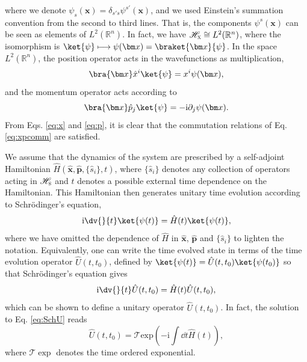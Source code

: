 \documentclass[letterpaper,12pt,titlepage,oneside,final]{book}
\newcommand{\ii}{\mathrm{i}}
\begin{document}
where we denote $\psi_s(\bm x)=\delta_{s's}\psi^{s'}(\bm x)$, and we used Einstein's summation convention from the second to third lines. That is, the components $\psi^s(\bm x)$ can be seen as elements of $L^2(\mathbb{R}^n)$. In fact, we have $\mathscr{H}_\textsc{x}\cong L^2(\mathbb{R}^n)$, where the isomorphism is $\ket{\psi}\longmapsto \psi(\bm x) = \braket{\bm x}{\psi}$. In the space $L^2(\mathbb{R}^n)$, the position operator acts in the wavefunctions as multiplication,
\begin{equation}\label{eq:x}
    \bra{\bm x}\hat{x}^i \ket{\psi} = x^i \psi(\bm x),
\end{equation}
and the momentum operator acts according to
\begin{equation}\label{eq:p}
    \bra{\bm x} \hat{p}_j \ket{\psi} = - \ii \partial_j \psi(\bm x).
\end{equation}
From Eqs. \eqref{eq:x} and \eqref{eq:p}, it is clear that the commutation relations of Eq. \eqref{eq:xpcomm} are satisfied. 

We assume that the dynamics of the system are prescribed by a self-adjoint Hamiltonian $\hat{H}(\hat{\bm x},\hat{\bm p}, \{\hat{s}_i\},t)$, where  $\{\hat{s}_i\}$ denotes any collection of operators acting in $\mathscr{H}_\textsc{s}$ and $t$ denotes a possible external time dependence on the Hamiltonian. This Hamiltonian then generates unitary time evolution according to Schr\"odinger's equation,
\begin{equation}
    \ii\dv{}{t}\ket{\psi(t)} = \hat{H}(t)\ket{\psi(t)},
\end{equation}
where we have omitted the dependence of $\hat{H}$ in $\hat{\bm x}$, $\hat{\bm p}$ and $\{\hat{s}_i\}$ to lighten the notation. Equivalently, one can write the time evolved state in terms of the time evolution operator $\hat{U}(t,t_0)$, defined by $\ket{\psi(t)} = \hat{U}(t,t_0)\ket{\psi(t_0)}$ so that Schr\"odinger's equation gives
\begin{equation}\label{eq:SchU}
    \ii\dv{}{t}\hat{U}(t,t_0) = \hat{H}(t)\hat{U}(t,t_0),
\end{equation}
which can be shown to define a unitary operator $\hat{U}(t,t_0)$. In fact, the solution to Eq. \eqref{eq:SchU} reads
\begin{equation}
    \hat{U}(t,t_0) = \mathcal{T}\text{exp}\left(-\ii \int \dd t \hat{H}(t)\right),
\end{equation}
where $\mathcal{T}\exp$ denotes the time ordered exponential. %
\end{document}
